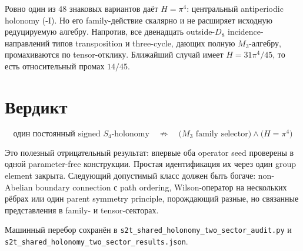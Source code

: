 \documentclass[12pt,a4paper]{article}
\begin{document}
Ровно один из \(48\) знаковых вариантов даёт \(H=\pi^4\): центральный
antiperiodic holonomy (-I). Но его family-действие скалярно и не расширяет
исходную редуцируемую алгебру. Напротив, все двенадцать outside-\(D_8\)
incidence-направлений типов transposition и three-cycle, дающих полную
\(M_3\)-алгебру, промахиваются по tensor-отклику. Ближайший случай имеет
\(H=31\pi^4/45\), то есть относительный промах \(14/45\).

\section{Вердикт}

\begin{equation}
 \boxed{
 \text{один постоянный signed }S_4\text{-holonomy}
 \quad\not\Rightarrow\quad
 \bigl(M_3\text{ family selector}\bigr)
 \land
 \bigl(H=\pi^4\bigr)
 }
\end{equation}

Это полезный отрицательный результат: впервые оба operator seed проверены в
одной parameter-free конструкции. Простая идентификация их через один group
element закрыта. Следующий допустимый класс должен быть богаче: non-Abelian
boundary connection с path ordering, Wilson-оператор на нескольких рёбрах или
один parent symmetry principle, порождающий разные, но связанные
представления в family- и tensor-секторах.

Машинный перебор сохранён в
\texttt{s2t\_shared\_holonomy\_two\_sector\_audit.py} и
\texttt{s2t\_shared\_holonomy\_two\_sector\_results.json}.
\end{document}
